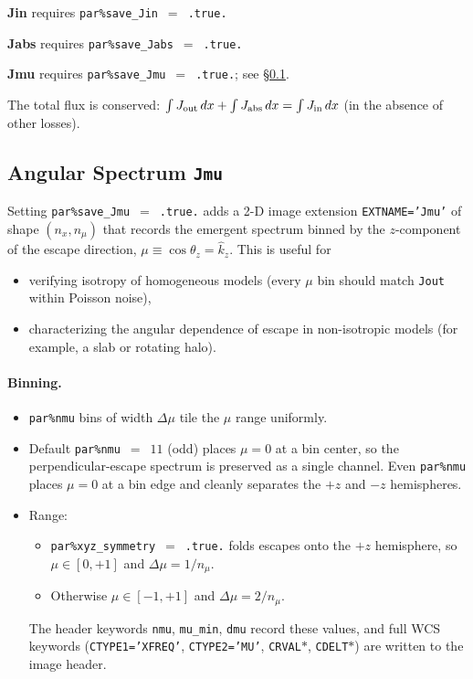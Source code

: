 \documentclass[english,a4paper]{my_memo}
\newcommand{\parm}[1]{\texttt{par\%#1}}
\begin{document}
\textbf{Jin} requires \parm{save\_Jin}~$=$~\texttt{.true.}

\textbf{Jabs} requires \parm{save\_Jabs}~$=$~\texttt{.true.}

\textbf{Jmu} requires \parm{save\_Jmu}~$=$~\texttt{.true.}; see
\S\ref{sec:jmu}.

The total flux is conserved: $\int J_{\rm out}\,dx + \int J_{\rm abs}\,dx = \int J_{\rm in}\,dx$
(in the absence of other losses).

\subsection{Angular Spectrum \texttt{Jmu}}
\label{sec:jmu}

Setting \parm{save\_Jmu}~$=$~\texttt{.true.} adds a 2-D image extension
\texttt{EXTNAME='Jmu'} of shape $(n_x, n_\mu)$ that records the emergent
spectrum binned by the $z$-component of the escape direction,
$\mu \equiv \cos\theta_z = \hat k_z$.  This is useful for
\begin{itemize}
  \item verifying isotropy of homogeneous models (every $\mu$ bin should
        match \texttt{Jout} within Poisson noise),
  \item characterizing the angular dependence of escape in non-isotropic
        models (for example, a slab or rotating halo).
\end{itemize}

\paragraph{Binning.}
\begin{itemize}
  \item \parm{nmu} bins of width $\Delta\mu$ tile the $\mu$ range
        uniformly.
  \item Default \parm{nmu}~$=$~$11$ (odd) places $\mu = 0$ at a bin
        center, so the perpendicular-escape spectrum is preserved as a
        single channel.  Even \parm{nmu} places $\mu = 0$ at a bin edge
        and cleanly separates the $+z$ and $-z$ hemispheres.
  \item Range:
        \begin{itemize}
          \item \parm{xyz\_symmetry}~$=$~\texttt{.true.} folds escapes
                onto the $+z$ hemisphere, so $\mu \in [0, +1]$ and
                $\Delta\mu = 1/n_\mu$.
          \item Otherwise $\mu \in [-1, +1]$ and $\Delta\mu = 2/n_\mu$.
        \end{itemize}
        The header keywords \texttt{nmu}, \texttt{mu\_min}, \texttt{dmu}
        record these values, and full WCS keywords (\texttt{CTYPE1='XFREQ'},
        \texttt{CTYPE2='MU'}, \texttt{CRVAL$\ast$}, \texttt{CDELT$\ast$})
        are written to the image header.
\end{itemize}
\end{document}
